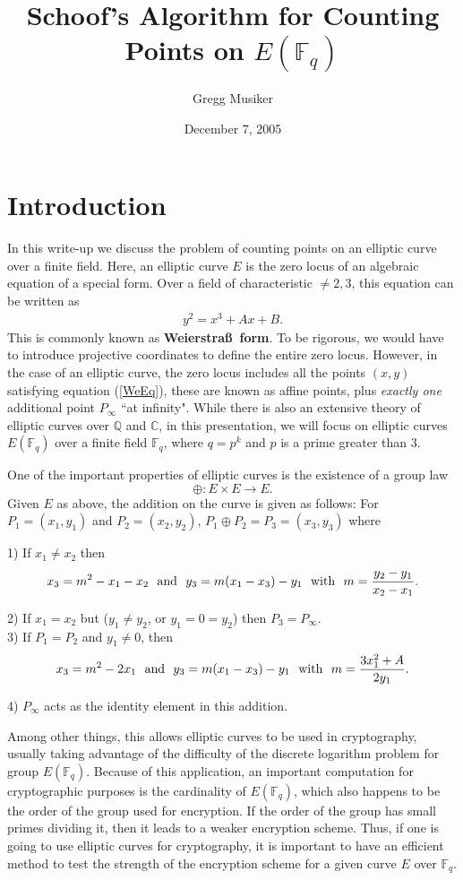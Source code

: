 \documentclass{article}
\newcommand{\q}{\mathbb{Q}}
\newcommand{\C}{\mathbb{C}}
\newcommand{\f}{\mathbb{F}}
\begin{document}
\title{Schoof's Algorithm for Counting Points on $E(\f_q)$}
\author{Gregg Musiker}
\date{December 7, 2005} \maketitle


\section{Introduction}

In this write-up we discuss the problem of counting points on an elliptic curve over a finite
field.  Here, an elliptic curve $E$ is the zero locus of an algebraic equation of a special form.
Over a field of characteristic $\not = 2, 3$, this equation can be written as \begin{eqnarray}
\label{WeEq} y^2 = x^3 + Ax+B.\end{eqnarray} This is commonly known as {\bf Weierstra\ss ~form}. To
be rigorous, we would have to introduce projective coordinates to define the entire zero locus.
However, in the case of an elliptic curve, the zero locus includes all the points $(x,y)$
satisfying equation (\ref{WeEq}), these are known as affine points, plus \emph{exactly one} additional
point $P_\infty$ ``at infinity".  While there is also an extensive theory of elliptic curves over
$\q$ and $\C$, in this presentation, we will focus on elliptic curves $E(\f_q)$ over a finite field
$\f_q$, where $q=p^k$ and $p$ is a prime greater than $3$.

One of the important properties of elliptic curves is the existence
of a group law $$\oplus : E \times E \rightarrow E.$$ Given $E$ as
above, the addition on the curve is given as follows: For $P_1 =
(x_1,y_1)$ and  $P_2 = (x_2,y_2)$, $P_1 \oplus P_2 = P_3 =
(x_3,y_3)$ where

1) If $x_1 \not = x_2$ then $$x_3 = m^2 - x_1 - x_2 \mathrm{~~and~~}
y_3 = m(x_1-x_3)-y_1 \mathrm{~~with~~} m= {y_2-y_1 \over x_2-x_1}.$$

2) If $x_1 = x_2$ but ($y_1\not = y_2$, or $y_1=0=y_2$)  then $P_3 = P_\infty$. \\

3) If $P_1 = P_2$ and $y_1 \not = 0$, then
$$x_3 = m^2 - 2x_1 \mathrm{~~and~~} y_3 = m(x_1-x_3)-y_1 \mathrm{~~with~~} m= {3x_1^2+A \over 2y_1}.$$

4) $P_\infty$ acts as the identity element in this addition.

\noindent Among other things, this allows elliptic curves to be used
in cryptography, usually taking advantage of the difficulty of the
discrete logarithm problem for group $E(\f_q)$. Because of this
application, an important computation for cryptographic purposes is
the cardinality of $E(\f_q)$, which also happens to be the order of
the group used for encryption.  If the order of the group has small
primes dividing it, then it leads to a weaker encryption scheme.
Thus, if one is going to use elliptic curves for cryptography, it is
important to have an efficient method to test the strength of the encryption scheme for a
given curve $E$ over $\f_q$.
\end{document}
